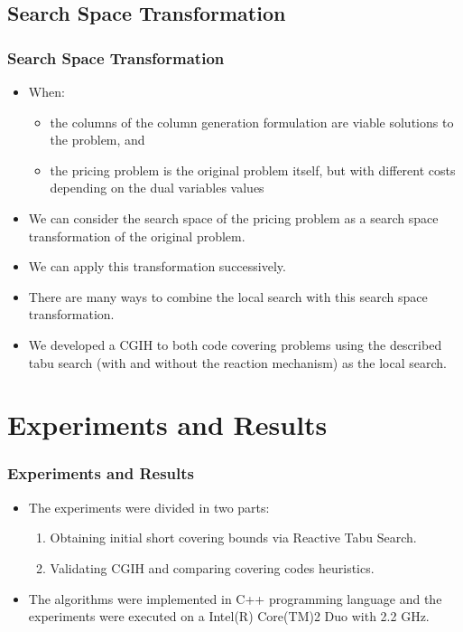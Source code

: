\documentclass{beamer}
\begin{document}
\subsection{Search Space Transformation}

\begin{frame}
  \frametitle{Search Space Transformation}
{
	
\begin{itemize}
	\item<1-> When:
		\begin{itemize}
		 	\item<2-> the columns of the column generation formulation are viable solutions to the problem, and
		 	\item<3-> the pricing problem is the original problem itself, but with different costs depending on the dual variables values
		 \end{itemize}
	\item<4-> We can consider the search space of the pricing problem as a search space transformation of the original problem.	
	\item<5-> We can apply this transformation successively.	
	\item<6-> There are many ways to combine the local search with this search space transformation.
	\item<7-> We developed a CGIH to both code covering problems using the described tabu search (with and without the reaction mechanism) as the local search.	
\end{itemize}
}
\end{frame}


\section{Experiments and Results}

\begin{frame}
  \frametitle{Experiments and Results}
{
	
\begin{itemize}
	\item<1-> The experiments were divided in two parts: 
\begin{enumerate}
	\item<1-> Obtaining initial short covering bounds via Reactive Tabu Search.
	\item<2-> Validating CGIH and comparing covering codes heuristics. 
\end{enumerate}

	\item<3-> The algorithms were implemented in C++ programming language and the
	experiments were executed on a Intel(R) Core(TM)2 Duo with 2.2 GHz.
	
\end{itemize}
}
\end{frame}
\end{document}
